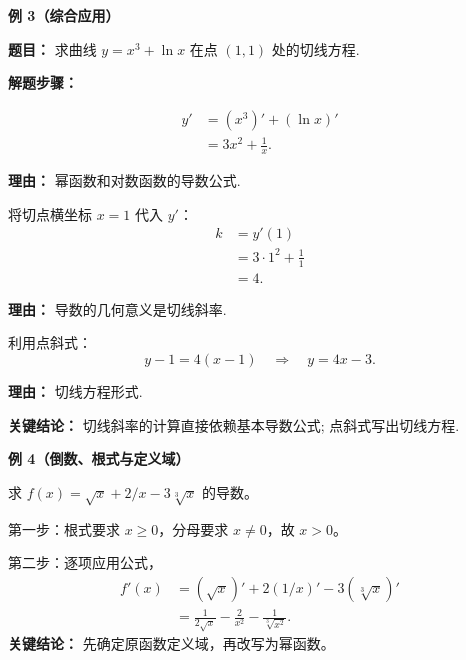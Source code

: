 \begin{examplebox}
\begin{minipage}{\linewidth}
\textbf{\textcolor{CExample}{例 3（综合应用）}}

	\textbf{\textcolor{CExample}{题目：}}
	求曲线 $y = x^3 + \ln x$ 在点 $(1,1)$ 处的切线方程.


\end{minipage}

	\textbf{\textcolor{CExample}{解题步骤：}}
	\begin{description}[style=nextline, leftmargin=2.8em, labelsep=0.5em, itemsep=0.45em]
		\item[\textbf{第一步（求导函数）：}]
			\[
				\begin{aligned}
					y' &= (x^3)' + (\ln x)' \\
					&= 3x^2 + \frac{1}{x}.
			\end{aligned}
			\]
			\par\textbf{理由：} 幂函数和对数函数的导数公式.

		\item[\textbf{第二步（计算斜率）：}] 将切点横坐标 $x=1$ 代入 $y'$：
			\[
				\begin{aligned}
					k &= y'(1) \\
					&= 3\cdot 1^2 + \frac{1}{1} \\
					&= 4.
			\end{aligned}
			\]
			\par\textbf{理由：} 导数的几何意义是切线斜率.

		\item[\textbf{第三步（写切线方程）：}] 利用点斜式：
			\[
				y - 1 = 4(x - 1) \quad\Rightarrow\quad y = 4x - 3.
			\]
			\par\textbf{理由：} 切线方程形式.
	\end{description}

	\textbf{\textcolor{CExample}{关键结论：}}
	切线斜率的计算直接依赖基本导数公式; 点斜式写出切线方程.

\medskip
\end{examplebox}

\begin{examplebox}
\begin{minipage}{\linewidth}
\textbf{\textcolor{CExample}{例 4（倒数、根式与定义域）}}

求 $f(x)=\sqrt{x}+2/x-3\sqrt[3]x$ 的导数。


\end{minipage}

第一步：根式要求 $x\ge0$，分母要求 $x\ne0$，故 $x>0$。

第二步：逐项应用公式，
\[
\begin{aligned}
f'(x)&=(\sqrt x)'+2(1/x)'-3(\sqrt[3]x)'\\
&=\frac1{2\sqrt x}-\frac2{x^2}-\frac1{\sqrt[3]{x^2}}.
\end{aligned}
\]
\textbf{关键结论：} 先确定原函数定义域，再改写为幂函数。

\medskip
\end{examplebox}

